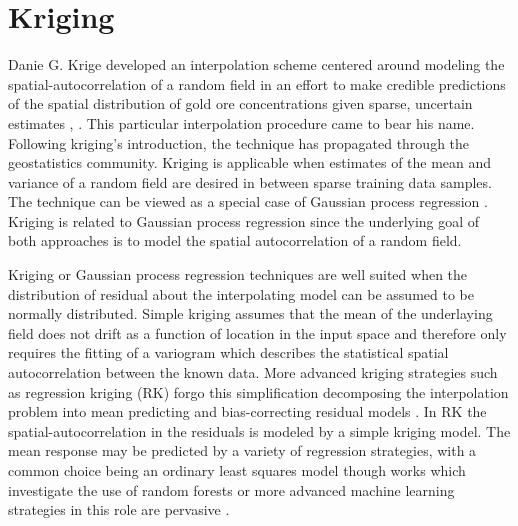 
\section{Kriging}

Danie G. Krige developed an interpolation scheme centered around modeling the spatial-autocorrelation of a random field in an effort to make credible predictions of the spatial distribution of gold ore concentrations given sparse, uncertain estimates \cite{krige51}, \cite{Krige51a}.  This particular interpolation procedure came to bear his name. Following kriging's introduction, the technique has propagated through the geostatistics community.  Kriging is applicable when estimates of the mean and variance of a random field are desired in between sparse training data samples.  The technique can be viewed as a special case of Gaussian process regression \cite{Williams96}.  Kriging is related to Gaussian process regression since the underlying goal of both approaches is to model the spatial autocorrelation of a random field.  

Kriging or Gaussian process regression techniques are well suited when the distribution of residual about the interpolating model can be assumed to be normally distributed.  Simple kriging assumes that the mean of the underlaying field does not drift as a function of location in the input space and therefore only requires the fitting of a variogram which describes the statistical spatial autocorrelation between the known data.  More advanced kriging strategies such as regression kriging (RK) forgo this simplification decomposing the interpolation problem into mean predicting and bias-correcting residual models \cite{Hengl07}.  In RK the spatial-autocorrelation in the residuals is modeled by a simple kriging model.  The mean response may be predicted by a variety of regression strategies, with a common choice being an ordinary least squares model though works which investigate the use of random forests or more advanced machine learning strategies in this role are pervasive \cite{LI20111647} \cite{LI2017112}.

